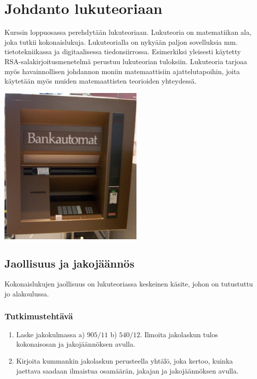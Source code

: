 \chapter{Johdanto lukuteoriaan}

Kurssin loppuosassa perehdytään lukuteoriaan. Lukuteoria on matematiikan ala, joka tutkii kokonaislukuja. Lukuteorialla on nykyään paljon sovelluksia mm. tietotekniikassa ja digitaalisessa tiedonsiirrossa. Esimerkiksi yleisesti käytetty RSA-sala\-kir\-joi\-tus\-me\-ne\-tel\-mä perustuu lukuteorian tuloksiin. Lukuteoria tarjoaa myös havainnollisen johdannon moniin matemaattisiin ajattelutapoihin, joita käytetään myös muiden matemaattisten teorioiden yhteydessä.

\begin{center}
\includegraphics[width=7cm]{pictures/kuvitus/Bankautomat} %
\end{center}


\section{Jaollisuus ja jakojäännös}
\label{jaollisuus}
Kokonaislukujen jaollisuus on lukuteoriassa keskeinen käsite, johon on tutustuttu jo alakoulussa.

\subsection*{Tutkimustehtävä} %
\begin{enumerate}
\item
Laske jakokulmassa a) $905 / 11$ b) $540 / 12$. Ilmoita jakolaskun tulos kokonaisosan ja jakojäännöksen avulla.
\item
Kirjoita kummankin jakolaskun perusteella yhtälö, joka kertoo, kuinka jaettava saadaan
ilmaistua osamäärän, jakajan ja jakojäännöksen avulla.
\end{enumerate}


